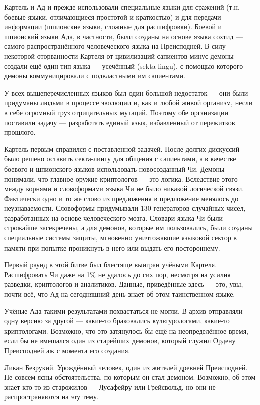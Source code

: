 \documentclass[a4paper,10pt]{book}
\begin{document}
Картель и Ад и прежде использовали специальные языки для сражений (т.н. боевые 
языки, отличающиеся простотой и краткостью) и для передачи информации 
(шпионские языки, сложные для расшифровки). Боевой и шпионский языки Ада, в 
частности, были созданы на основе языка сохтид --- самого распространённого 
человеческого языка на Преисподней. В силу некоторой оторванности Картеля от 
цивилизаций сапиентов минус-демоны создали ещё один тип языка --- усечённый 
(sekta-lingu), с помощью которого демоны коммуницировали с подвластными им 
сапиентами.

У всех вышеперечисленных языков был один большой недостаток --- они были 
придуманы людьми в процессе эволюции и, как и любой живой организм, несли в 
себе огромный груз отрицательных мутаций. Поэтому обе организации поставили 
задачу --- разработать единый язык, избавленный от пережитков прошлого.

Картель первым справился с поставленной задачей. После долгих дискуссий было 
решено оставить секта-лингу для общения с сапиентами, а в качестве боевого и 
шпионского языков использовать новосозданный Чи. Демоны понимали, что главное 
оружие криптологов --- это логика. Вследствие этого между корнями и 
словоформами языка Чи не было никакой логической связи. Фактически одно и то же 
слово из предложения в предложение менялось до неузнаваемости. Словоформы 
придумывали 130 генераторов случайных чисел, разработанных на основе 
человеческого мозга. Словари языка Чи были строжайше засекречены, а для 
демонов, которые им пользовались, были созданы специальные системы защиты, 
мгновенно уничтожавшие языковой сектор в памяти при попытке проникнуть в него 
или выдать его постороннему.

Первый раунд в этой битве был блестяще выигран учёными Картеля. Расшифровать Чи 
даже на 1\% не удалось до сих пор, несмотря на усилия разведки, криптологов и 
аналитиков. Данные, приведённые здесь --- это, увы, почти всё, что Ад на 
сегодняшний день знает об этом таинственном языке.

Учёные Ада такими результатами похвастаться не могли. В архив отправляли одну 
версию за другой --- какие-то браковались культурологами, какие-то 
криптологами. Возможно, что это затянулось бы ещё на неопределённое время, если 
бы не вмешался один из старейших демонов, который служил Ордену Преисподней аж 
с момента его создания.

Ликан Безрукий. Урождённый человек, один из жителей древней Преисподней. Не 
совсем ясны обстоятельства, по которым он стал демоном. Возможно, об этом знает 
кто-то из старожилов --- Лусафейру или Грейсвольд, но они не распространяются 
на эту тему.
\end{document}

